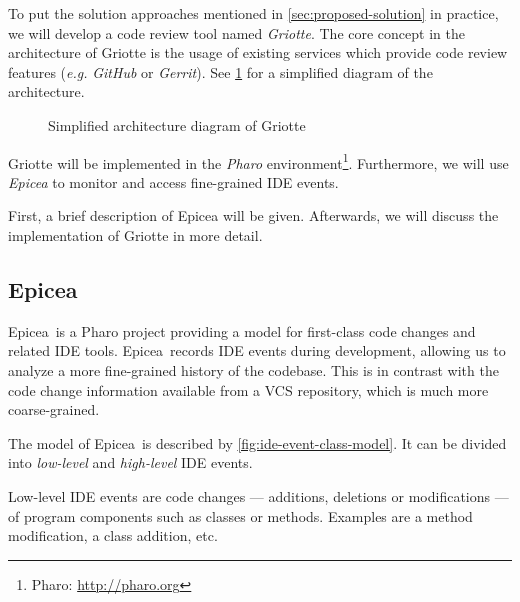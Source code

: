 \documentclass[conference,a4paper]{IEEEtran}
\newcommand{\Ep}{Epicea}
\begin{document}
To put the solution approaches mentioned in
\cref{sec:proposed-solution} in practice, we will develop a code
review tool named \textit{Griotte}. The core concept in the
architecture of Griotte is the usage of existing services which
provide code review features (\textit{e.g.} \textit{GitHub} or
\textit{Gerrit}). See \cref{fig:diagram} for a simplified diagram of
the architecture.
\begin{figure}[t]
  \caption{Simplified architecture diagram of Griotte}
  \label{fig:diagram}
\end{figure}

Griotte will be implemented in the \textit{Pharo}
environment\cite{Blac09a}\footnote{Pharo: \url{http://pharo.org}}.
Furthermore, we will use \textit{Epicea}\cite{Dias13a} to monitor and
access fine-grained IDE events.

First, a brief description of Epicea will be given. Afterwards, we
will discuss the implementation of Griotte in more detail.

\subsection{Epicea}
\label{sec:epicea}

\Ep\ is a Pharo project providing a model for first-class code changes
and related IDE tools. \Ep\ records IDE events during development,
allowing us to analyze a more fine-grained history of the
codebase. This is in contrast with the code change information
available from a VCS repository, which is much more coarse-grained.

The model of \Ep\ is described by \cref{fig:ide-event-class-model}. It
can be divided into \textit{low-level} and \textit{high-level} IDE
events.

Low-level IDE events are code changes --- additions, deletions or
modifications --- of program components such as classes or
methods. Examples are a method modification, a class addition, etc.
\end{document}
